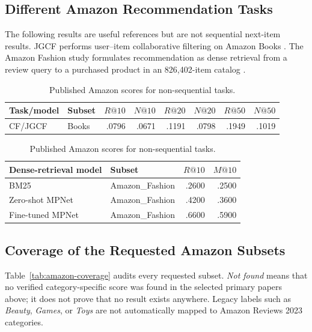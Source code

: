 \subsection{Different Amazon Recommendation Tasks}

The following results are useful references but are not sequential next-item
results. JGCF performs user--item collaborative filtering on Amazon Books
\cite{JGCF}. The Amazon Fashion study formulates recommendation as dense
retrieval from a review query to a purchased product in an 826,402-item
catalog \cite{FASHIONRETRIEVAL}.

\begin{table}[H]
\centering
\caption{Published Amazon scores for non-sequential tasks.}
\label{tab:amazon-other-tasks}
\footnotesize
\begin{tabular}{@{}llrrrrrr@{}}
\toprule
Task/model & Subset & $R@10$ & $N@10$ & $R@20$ & $N@20$ & $R@50$ & $N@50$ \\
\midrule
CF/JGCF & Books & .0796 & .0671 & .1191 & .0798 & .1949 & .1019 \\
\bottomrule
\end{tabular}

\vspace{0.8em}
\begin{tabular}{@{}llrr@{}}
\toprule
Dense-retrieval model & Subset & $R@10$ & $M@10$ \\
\midrule
BM25 & Amazon\_Fashion & .2600 & .2500 \\
Zero-shot MPNet & Amazon\_Fashion & .4200 & .3600 \\
Fine-tuned MPNet & Amazon\_Fashion & .6600 & .5900 \\
\bottomrule
\end{tabular}
\end{table}

\subsection{Coverage of the Requested Amazon Subsets}

Table~\ref{tab:amazon-coverage} audits every requested subset. \emph{Not found}
means that no verified category-specific score was found in the selected
primary papers above; it does not prove that no result exists anywhere. Legacy
labels such as \emph{Beauty}, \emph{Games}, or \emph{Toys} are not
automatically mapped to Amazon Reviews 2023 categories.

